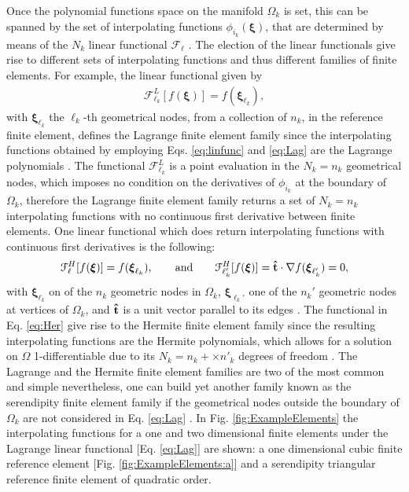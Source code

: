 Once the polynomial functions space on the manifold $\Omega_k$ is set, this can be spanned by the set of interpolating functions $\phi_{i_k}(\boldsymbol{\xi})$, that are determined by means of the $N_k$ linear functional  $\mathcal{F}_\ell$ \cite{larson_finite_2013}.   The election of the  linear functionals give rise to different sets of interpolating functions and thus different families of finite elements. For example, the linear functional given by
\begin{align}
 \mathcal{F}^{L}_{\ell_k}[f(\boldsymbol{\xi})] = f(\boldsymbol{\xi}_{\ell_k}) ,
\label{eq:Lag}
\end{align}
%
with  $\boldsymbol{\xi}_{\ell_k}$ the $\ell_k$-th  geometrical nodes, from a collection of $n_k$, in the reference finite element, defines the Lagrange finite element family since the  interpolating functions obtained by employing Eqs. \eqref{eq:linfunc} and \eqref{eq:Lag} are the Lagrange polynomials \cite{larson_finite_2013,dhatt_finite_2012,fletcher_computational_1984}. The functional $\mathcal{F}^{L}_{\ell_k}$ is a point evaluation in the $N_k = n_k$  geometrical nodes, which imposes no condition on the derivatives of $\phi_{i_k}$ at the boundary of $\Omega_k$, therefore the Lagrange finite element family returns a set of $N_k = n_k$ interpolating functions with no continuous first derivative between finite elements. One linear functional which does return interpolating functions with continuous first derivatives is the following:
%
\begin{align}
     \mathcal{F}^{H}_\ell[f(\boldsymbol{\xi})] = f(\boldsymbol{\xi}_{\ell_k}) ,
     \qquad
     \text{and}
     \qquad
     \mathcal{F}^{H}_{\ell_k'}[f(\boldsymbol{\xi})] = \vu{t}\cdot\nabla  f(\boldsymbol{\xi}_{\ell_k'}) = 0,
\label{eq:Her}
\end{align}
%
with $\boldsymbol{\xi}_{\ell_k}$ on of the $n_k$ geometric nodes in $\Omega_k$, $\boldsymbol{\xi}_{\ell_k'}$ one of the $n_k'$  geometric nodes at vertices of $\Omega_k$, and $\vu{t}$ is a unit vector parallel to its edges \cite{larson_finite_2013}. The functional in Eq. \eqref{eq:Her} give rise to the Hermite finite element family since the resulting interpolating functions are the Hermite polynomials, which allows for a solution on $\Omega$ 1-differentiable due to its $N_k = n_k + \times n'_k$ degrees of freedom \cite{dhatt_finite_2012,larson_finite_2013}. The Lagrange and the Hermite finite element families are two of the most common and simple nevertheless, one can build yet another family known as the serendipity finite element family  if the geometrical nodes outside the boundary of $\Omega_k$ are not considered in Eq. \eqref{eq:Lag} \cite{fletcher_computational_1984}. In Fig. \ref{fig:ExampleElements} the interpolating functions for a one and two dimensional finite elements under the Lagrange linear functional [Eq. \eqref{eq:Lag}] are shown:  a one dimensional cubic finite reference element [Fig. \ref{fig:ExampleElements:a}] and a serendipity triangular reference finite element of quadratic order.

